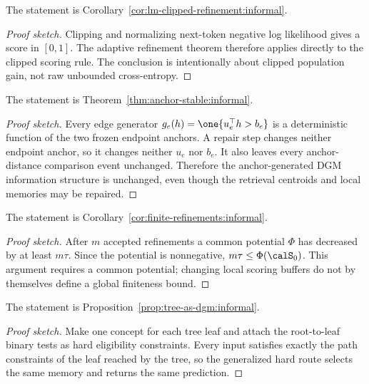 \begin{corollary}
\label{cor:lm-clipped-refinement:sketch}
The statement is Corollary~\ref{cor:lm-clipped-refinement:informal}.
\end{corollary}
\begin{proof}[Proof sketch]
Clipping and normalizing next-token negative log likelihood gives a score in $[0,1]$. The adaptive refinement theorem therefore applies directly to the clipped scoring rule. The conclusion is intentionally about clipped population gain, not raw unbounded cross-entropy.
\end{proof}

\begin{theorem}
\label{thm:anchor-stable:sketch}
The statement is Theorem~\ref{thm:anchor-stable:informal}.
\end{theorem}
\begin{proof}[Proof sketch]
Every edge generator $g_e(h)=\one\{u_e^\top h>b_e\}$ is a deterministic function of the two frozen endpoint anchors. A repair step changes neither endpoint anchor, so it changes neither $u_e$ nor $b_e$. It also leaves every anchor-distance comparison event unchanged. Therefore the anchor-generated DGM information structure is unchanged, even though the retrieval centroids and local memories may be repaired.
\end{proof}

\begin{corollary}
\label{cor:finite-refinements:sketch}
The statement is Corollary~\ref{cor:finite-refinements:informal}.
\end{corollary}
\begin{proof}[Proof sketch]
After $m$ accepted refinements a common potential $\Phi$ has decreased by at least $m\tau$. Since the potential is nonnegative, $m\tau\le \Phi(\calS_0)$. This argument requires a common potential; changing local scoring buffers do not by themselves define a global finiteness bound.
\end{proof}

\begin{proposition}
\label{prop:tree-as-dgm:sketch}
The statement is Proposition~\ref{prop:tree-as-dgm:informal}.
\end{proposition}
\begin{proof}[Proof sketch]
Make one concept for each tree leaf and attach the root-to-leaf binary tests as hard eligibility constraints. Every input satisfies exactly the path constraints of the leaf reached by the tree, so the generalized hard route selects the same memory and returns the same prediction.
\end{proof}


